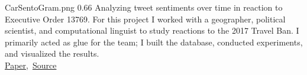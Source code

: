   {CarSentoGram.png}
  {0.66}
  {%
    Analyzing tweet sentiments over time in reaction to Executive Order 13769.
    For this project I worked with a geographer, political scientist, and computational linguist to study reactions to the 2017 Travel Ban.
    I primarily acted as glue for the team; I built the database, conducted experiments, and visualized the results.\\
    \raggedleft\href{https://www.tandfonline.com/doi/full/10.1080/15230406.2018.1510343}{Paper},\, \href{https://github.com/ryan-p-larson/paper}{Source}\quad
  }